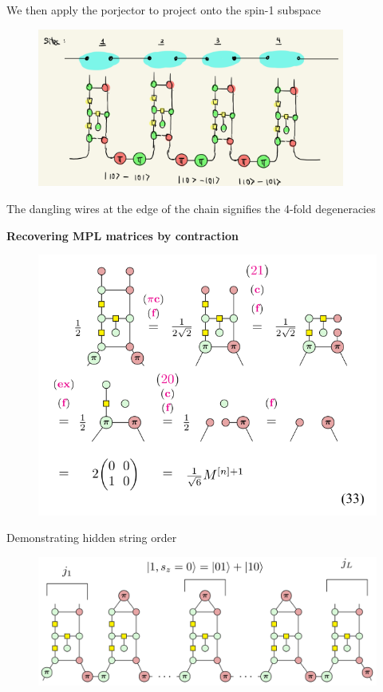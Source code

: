 \documentclass[aspectratio=169,xcolor=dvipsnames, t]{beamer}
\begin{document}
\begin{frame}
    We then apply the porjector to project onto the spin-1 subspace 
    \begin{figure}
        \includegraphics[width=0.9\textwidth]{figures/aklt_valence_bond_plus_projector.PNG}
    \end{figure}
    The dangling wires at the edge of the chain signifies the 4-fold degeneracies 
\end{frame}

\begin{frame}
    \textbf{Recovering MPL matrices by contraction} 
    \begin{figure}
        \includegraphics[width=.8\textwidth]{figures/mpl_matrix_graph_reduction_m1.PNG}
    \end{figure}
\end{frame}



\begin{frame}{Demonstrating hidden string order}
    \begin{figure}
        \includegraphics[width=.8\textwidth]{figures/zx_hidden_string_order_strategy.png}
    \end{figure}
\end{frame}
\end{document}

